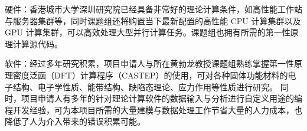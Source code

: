   硬件：香港城市大学深圳研究院已经具备非常好的理论计算条件，如高性能工作站与服务器集群等，同时课题组还将购置当下最新配置的高性能
  CPU 计算集群以及 GPU
  计算集群，可以高效处理大型并行计算任务。课题组也拥有所需的第一性原理计算源代码。

  软件：经过多年研究积累，项目申请人与所在黄勃龙教授课题组熟练掌握第一性原理密度泛函（DFT）计算程序（CASTEP）的使用，可对各种固体功能材料的电子结构、电子学性质、能带结构、缺陷态理论、应力作用等性质进行研究。
  同时，项目申请人有多年的针对理论计算软件的数据输入与分析进行自定义用途的编程开发经验，可为本项目所需的大量建模与数据处理工作节省大量的人力成本，也降低了人为介入带来的错误积累可能。

